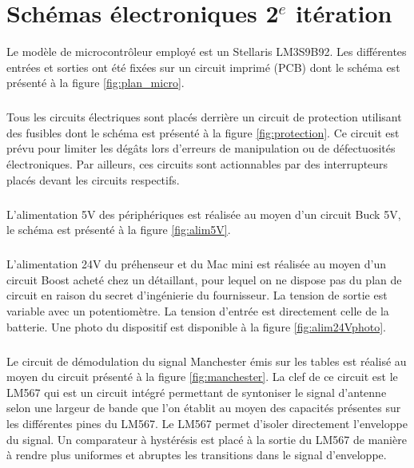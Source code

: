 


\chapter{Schémas électroniques 2$^{e}$ itération}
\label{electronics}
Le modèle de microcontrôleur employé est un Stellaris LM3S9B92. Les différentes entrées et sorties ont été fixées sur un circuit imprimé (PCB) dont le schéma est présenté à la figure \ref{fig:plan_micro}. 
\paragraph{}Tous les circuits électriques sont placés derrière un circuit de protection utilisant des fusibles dont le schéma est présenté à la figure \ref{fig:protection}. Ce circuit est prévu pour limiter les dégâts lors d'erreurs de manipulation ou de défectuosités électroniques. Par ailleurs, ces circuits sont actionnables par des interrupteurs placés devant les circuits respectifs. 
\paragraph{}L'alimentation 5V des périphériques est réalisée au moyen d'un circuit Buck 5V, le schéma est présenté à la figure \ref{fig:alim5V}.
\paragraph{}L'alimentation 24V du préhenseur et du Mac mini est réalisée au moyen d'un circuit Boost acheté chez un détaillant, pour lequel on ne dispose pas du plan de circuit en raison du secret d'ingénierie du fournisseur. La tension de sortie est variable avec un potentiomètre. La tension d'entrée est directement celle de la batterie. Une photo du dispositif est disponible à la figure \ref{fig:alim24Vphoto}.
\paragraph{}Le circuit de démodulation du signal Manchester émis sur les tables est réalisé au moyen du circuit présenté à la figure \ref{fig:manchester}. La clef de ce circuit est le LM567 qui est un circuit intégré permettant de syntoniser le signal d'antenne selon une largeur de bande que l'on établit au moyen des capacités présentes sur les différentes pines du LM567. Le LM567 permet d'isoler directement l'enveloppe du signal. Un comparateur à hystérésis est placé à la sortie du LM567 de manière à rendre plus uniformes et abruptes les transitions dans le signal d'enveloppe. 
